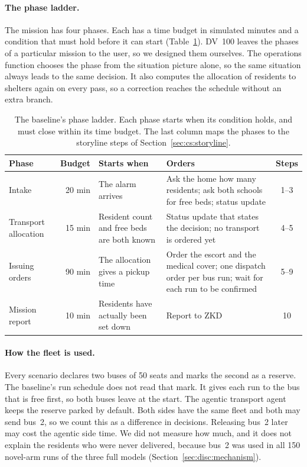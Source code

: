 

\paragraph{The phase ladder.}\label{sec:wf:steps} The mission has four phases.
Each has a time budget in simulated minutes and a condition that must hold
before it can start (Table~\ref{tab:wf:phases}). DV~100 leaves the phases of a
particular mission to the user, so we designed them ourselves. The operations
function chooses the phase from the situation picture alone, so the same
situation always leads to the same decision. It also computes the allocation
of residents to shelters again on every pass, so a correction reaches the
schedule without an extra branch.

\begin{table}[htbp]
\centering
\caption{The baseline's phase ladder. Each phase starts when its condition
holds, and must close within its time budget. The last column maps the phases
to the storyline steps of Section~\ref{sec:cs:storyline}.}
\label{tab:wf:phases}
\footnotesize
\begin{tabularx}{\textwidth}{@{}l r >{\raggedright\arraybackslash}X >{\raggedright\arraybackslash}X c@{}}
\toprule
Phase & Budget & Starts when & Orders & Steps \\
\midrule
Intake & 20 min & The alarm arrives & Ask the home how many residents; ask both schools for free beds; status update & 1--3 \\
Transport allocation & 15 min & Resident count and free beds are both known & Status update that states the decision; no transport is ordered yet & 4--5 \\
Issuing orders & 90 min & The allocation gives a pickup time & Order the escort and the medical cover; one dispatch order per bus run; wait for each run to be confirmed & 5--9 \\
Mission report & 10 min & Residents have actually been set down & Report to ZKD & 10 \\
\bottomrule
\end{tabularx}
\end{table}

\paragraph{How the fleet is used.}\label{sec:wf:fleet} Every scenario declares
two buses of 50 seats and marks the second as a reserve. The baseline's run
schedule does not read that mark. It gives each run to the bus that is free
first, so both buses leave at the start. The agentic transport agent keeps the
reserve parked by default. Both sides have the same fleet and both may send
bus~2, so we count this as a difference in decisions. Releasing bus~2 later may cost the agentic side time.
We did not measure how much, and it does not explain the residents who were
never delivered, because bus~2 was used in all 150 novel-arm runs of the three
full models (Section~\ref{sec:disc:mechanism}).

